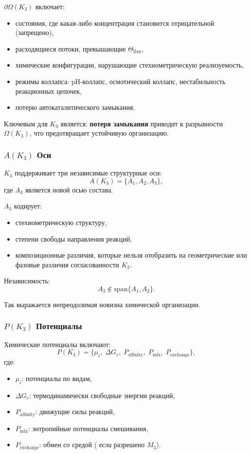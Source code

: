 $\partial\Omega(K_3)$ включает:
\begin{itemize}
    \item состояния, где какая-либо концентрация становится отрицательной
          (запрещено),
    \item расходящиеся потоки, превышающие $\Theta_{\mathrm{flux}}$,
    \item химические конфигурации, нарушающие стехиометрическую реализуемость,
    \item режимы коллапса: pH-коллапс, осмотический коллапс,
          нестабильность реакционных цепочек,
    \item потерю автокаталитического замыкания.
\end{itemize}

Ключевым для $K_3$ является:
\textbf{потеря замыкания} приводит к разрывности $\Omega(K_3)$,
что предотвращает устойчивую организацию.

\subsubsection{\texorpdfstring{$A(K_3)$}{A(K_3)} Оси}

$K_3$ поддерживает три независимые структурные оси:
\[
A(K_3) = \{A_1, A_2, A_3\},
\]
где $A_3$ является новой осью состава.

$A_3$ кодирует:
\begin{itemize}
    \item стехиометрическую структуру,
    \item степени свободы направления реакций,
    \item композиционные различия, которые нельзя отобразить на
          геометрические или фазовые различия согласованности $K_2$.
\end{itemize}

Независимость:
\[
A_3 \notin \mathrm{span}\{A_1,A_2\}.
\]

Так выражается непреодолимая новизна химической организации.

\subsubsection{\texorpdfstring{$P(K_3)$}{P(K_3)} Потенциалы}

Химические потенциалы включают:
\[
P(K_3) = \{ \mu_i,\; \Delta G_r,\; P_{\mathrm{affinity}},\;
           P_{\mathrm{mix}},\; P_{\mathrm{exchange}}\},
\]
где:
\begin{itemize}
    \item $\mu_i$: потенциалы по видам,
    \item $\Delta G_r$: термодинамически свободные энергии реакций,
    \item $P_{\mathrm{affinity}}$: движущие силы реакций,
    \item $P_{\mathrm{mix}}$: энтропийные потенциалы смешивания,
    \item $P_{\mathrm{exchange}}$: обмен со средой (
          \emph{если} разрешено $M_3$).
\end{itemize}

